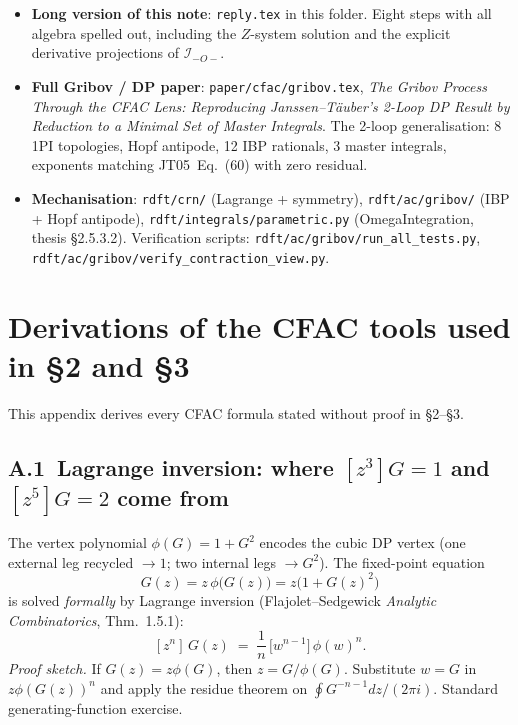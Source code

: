 \documentclass[11pt,a4paper]{article}
\begin{document}
\begin{itemize}[itemsep=2pt,leftmargin=1.5em]
\item \textbf{Long version of this note}: \texttt{reply.tex} in this folder. Eight steps
with all algebra spelled out, including the $Z$-system solution and the explicit
derivative projections of $\mathcal I_{-O-}$.
\item \textbf{Full Gribov / DP paper}: \texttt{paper/cfac/gribov.tex}, \emph{The Gribov
Process Through the CFAC Lens: Reproducing Janssen--T\"auber's 2-Loop DP Result by
Reduction to a Minimal Set of Master Integrals}. The 2-loop generalisation: 8 1PI
topologies, Hopf antipode, 12 IBP rationals, 3 master integrals, exponents matching
JT05~Eq.~(60) with zero residual.
\item \textbf{Mechanisation}: \texttt{rdft/crn/} (Lagrange + symmetry), \texttt{rdft/ac/gribov/}
(IBP + Hopf antipode), \texttt{rdft/integrals/parametric.py} (OmegaIntegration, thesis
\S 2.5.3.2). Verification scripts: \texttt{rdft/ac/gribov/run\_all\_tests.py},
\texttt{rdft/ac/gribov/verify\_contraction\_view.py}.
\end{itemize}

\appendix

\section{Derivations of the CFAC tools used in \S 2 and \S 3}

\label{app:derivs}

This appendix derives every CFAC formula stated without proof in \S 2--\S 3.

\subsection*{A.1\ Lagrange inversion: where $[z^{3}]G = 1$ and $[z^{5}]G = 2$ come from}

The vertex polynomial $\phi(G)=1+G^{2}$ encodes the cubic DP vertex (one external leg
recycled $\to 1$; two internal legs $\to G^{2}$). The fixed-point equation
\[
G(z) = z\,\phi\bigl(G(z)\bigr) = z\bigl(1 + G(z)^{2}\bigr)
\]
is solved \emph{formally} by Lagrange inversion (Flajolet--Sedgewick \emph{Analytic
Combinatorics}, Thm.\ 1.5.1):
\[
\boxed{\;[z^{n}]\,G(z) \;=\; \frac{1}{n}\,\bigl[w^{n-1}\bigr]\,\phi(w)^{n}.\;}
\]
\textit{Proof sketch.} If $G(z) = z\phi(G)$, then $z = G/\phi(G)$. Substitute $w = G$
in $z\phi(G(z))^{n}$ and apply the residue theorem on $\oint G^{-n-1}dz/(2\pi i)$.
Standard generating-function exercise.
\end{document}
